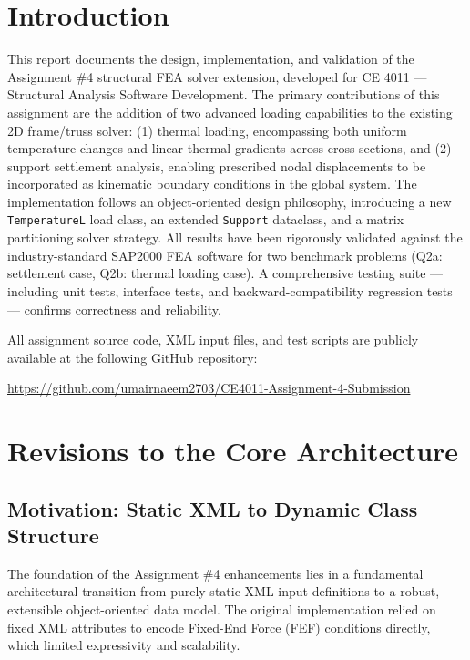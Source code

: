 \documentclass[12pt,a4paper]{article}
\begin{document}
\section{Introduction}

This report documents the design, implementation, and validation of the Assignment \#4 structural FEA solver extension, developed for CE 4011 --- Structural Analysis Software Development. The primary contributions of this assignment are the addition of two advanced loading capabilities to the existing 2D frame/truss solver: (1) thermal loading, encompassing both uniform temperature changes and linear thermal gradients across cross-sections, and (2) support settlement analysis, enabling prescribed nodal displacements to be incorporated as kinematic boundary conditions in the global system. The implementation follows an object-oriented design philosophy, introducing a new \texttt{TemperatureL} load class, an extended \texttt{Support} dataclass, and a matrix partitioning solver strategy. All results have been rigorously validated against the industry-standard SAP2000 FEA software for two benchmark problems (Q2a: settlement case, Q2b: thermal loading case). A comprehensive testing suite --- including unit tests, interface tests, and backward-compatibility regression tests --- confirms correctness and reliability.

All assignment source code, XML input files, and test scripts are publicly available at the following GitHub repository:

\begin{center}
    \url{https://github.com/umairnaeem2703/CE4011-Assignment-4-Submission}
\end{center}


\section{Revisions to the Core Architecture}

\subsection{Motivation: Static XML to Dynamic Class Structure}

The foundation of the Assignment \#4 enhancements lies in a fundamental architectural transition from purely static XML input definitions to a robust, extensible object-oriented data model. The original implementation relied on fixed XML attributes to encode Fixed-End Force (FEF) conditions directly, which limited expressivity and scalability.
\end{document}
